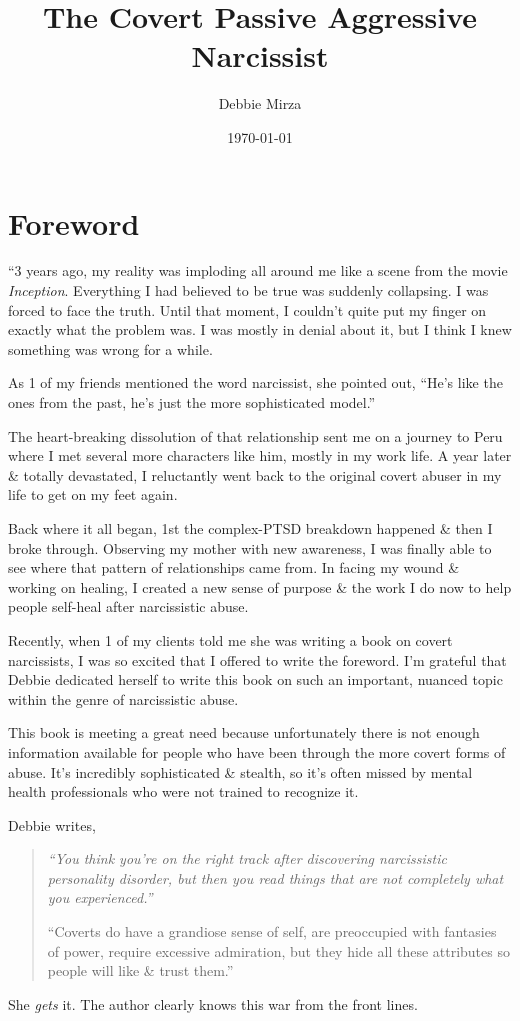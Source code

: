 \documentclass{article}
\title{The Covert Passive Aggressive Narcissist}
\author{Debbie Mirza}
\date{\today}
\numberwithin{equation}{section}
\begin{document}
\maketitle
\tableofcontents


\section*{Foreword}
``3 years ago, my reality was imploding all around me like a scene from the movie \textit{Inception}. Everything I had believed to be true was suddenly collapsing. I was forced to face the truth. Until that moment, I couldn't quite put my finger on exactly what the problem was. I was mostly in denial about it, but I think I knew something was wrong for a while.

As 1 of my friends mentioned the word narcissist, she pointed out, ``He's like the ones from the past, he's just the more sophisticated model.''

The heart-breaking dissolution of that relationship sent me on a journey to Peru where I met several more characters like him, mostly in my work life. A year later \& totally devastated, I reluctantly went back to the original covert abuser in my life to get on my feet again.

Back where it all began, 1st the complex-PTSD breakdown happened \& then I broke through. Observing my mother with new awareness, I was finally able to see where that pattern of relationships came from. In facing my wound \& working on healing, I created a new sense of purpose \& the work I do now to help people self-heal after narcissistic abuse.

Recently, when 1 of my clients told me she was writing a book on covert narcissists, I was so excited that I offered to write the foreword. I'm grateful that Debbie dedicated herself to write this book on such an important, nuanced topic within the genre of narcissistic abuse.

This book is meeting a great need because unfortunately there is not enough information available for people who have been through the more covert forms of abuse. It's incredibly sophisticated \& stealth, so it's often missed by mental health professionals who were not trained to recognize it.

Debbie writes,
\begin{quotation}\it
	``You think you're on the right track after discovering narcissistic personality disorder, but then you read things that are not completely what you experienced.''
	
	``Coverts do have a grandiose sense of self, are preoccupied with fantasies of power, require excessive admiration, but they hide all these attributes so people will like \& trust them.''
\end{quotation}
She \textit{gets} it. The author clearly knows this war from the front lines.
\end{document}
